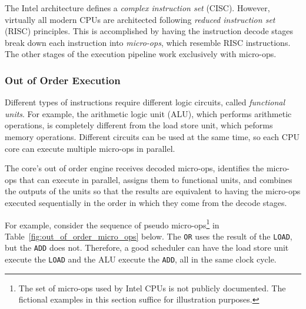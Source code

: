 
The Intel architecture defines a \textit{complex instruction set} (CISC).
However, virtually all modern CPUs are architected following \textit{reduced
instruction set} (RISC) principles. This is accomplished by having the
instruction decode stages break down each instruction into \textit{micro-ops},
which resemble RISC instructions. The other stages of the execution pipeline
work exclusively with micro-ops.


\subsubsection{Out of Order Execution}


Different types of instructions require different logic circuits, called
\textit{functional units}. For example, the arithmetic logic unit (ALU), which
performs arithmetic operations, is completely different from the load store
unit, which peforms memory operations. Different circuits can be used at the
same time, so each CPU core can execute multiple micro-ops in parallel.

The core's out of order engine receives decoded micro-ops, identifies the
micro-ops that can execute in parallel, assigns them to functional units, and
combines the outputs of the units so that the results are equivalent to having
the micro-ops executed sequentially in the order in which they come from the
decode stages.

For example, consider the sequence of pseudo micro-ops\footnote{The set of
micro-ops used by Intel CPUs is not publicly documented. The fictional examples
in this section suffice for illustration purposes.} in
Table~\ref{fig:out_of_order_micro_ops} below. The \texttt{OR} uses the result
of the \texttt{LOAD}, but the \texttt{ADD} does not. Therefore, a good
scheduler can have the load store unit execute the \texttt{LOAD} and the ALU
execute the \texttt{ADD}, all in the same clock cycle.

\begin{table}[hbt]
  \caption{
    Pseudo micro-ops for the out of order execution example.
  }
  \label{fig:out_of_order_micro_ops}
\end{table}

